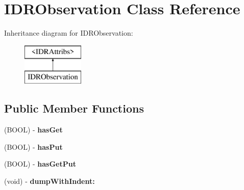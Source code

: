 \hypertarget{interface_i_d_r_observation}{
\section{IDRObservation Class Reference}
\label{interface_i_d_r_observation}
}
Inheritance diagram for IDRObservation:\begin{figure}[H]
\begin{center}
\leavevmode
\includegraphics[height=2.000000cm]{interface_i_d_r_observation}
\end{center}
\end{figure}
\subsection*{Public Member Functions}
\begin{DoxyCompactItemize}
\item 
\hypertarget{interface_i_d_r_observation_a3779a1e0f3784cd7e018860192e3bdaf}{
(BOOL) -\/ {\bfseries hasGet}}
\label{interface_i_d_r_observation_a3779a1e0f3784cd7e018860192e3bdaf}

\item 
\hypertarget{interface_i_d_r_observation_a42038052b16359eb12e73f2770888d9b}{
(BOOL) -\/ {\bfseries hasPut}}
\label{interface_i_d_r_observation_a42038052b16359eb12e73f2770888d9b}

\item 
\hypertarget{interface_i_d_r_observation_a1557c8a9ef628d5e79efb7d9275c99c1}{
(BOOL) -\/ {\bfseries hasGetPut}}
\label{interface_i_d_r_observation_a1557c8a9ef628d5e79efb7d9275c99c1}

\item 
\hypertarget{interface_i_d_r_observation_a086dcdde298292aa478db85e549bd3b5}{
(void) -\/ {\bfseries dumpWithIndent:}}
\label{interface_i_d_r_observation_a086dcdde298292aa478db85e549bd3b5}

\end{DoxyCompactItemize}

